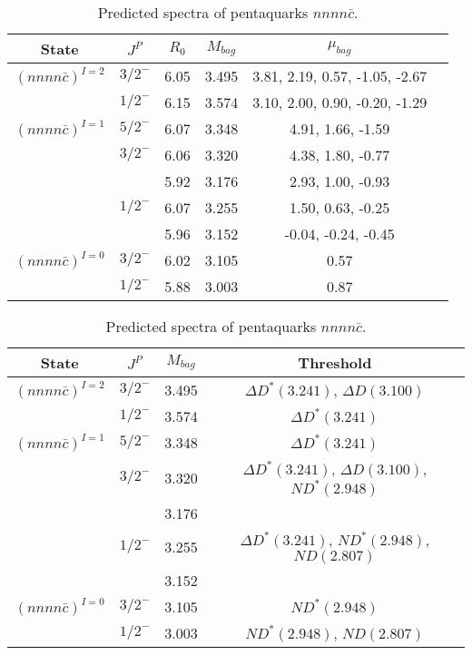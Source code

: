 \documentclass[prd,twocolumn,floatfix,nofootinbib]{revtex4}
\begin{document}
\renewcommand{\tabcolsep}{0.5cm}
\renewcommand{\arraystretch}{1.2}
\begin{table*}[!htbp]
    \caption{Predicted spectra of pentaquarks $nnnn\bar{c}$.}
    \begin{tabular}{cccccc}
        \hline\hline
        {\rm State} &$J^{P}$ &$R_{0}$ &$M_{bag}$ &$\mu_{bag}$  \\ \hline
        ${(nnnn\bar{c})}^{I=2}$
            &${3/2}^{-}$    &6.05   &3.495  &3.81, 2.19, 0.57, -1.05, -2.67 \\
            &${1/2}^{-}$    &6.15   &3.574  &3.10, 2.00, 0.90, -0.20, -1.29 \\
        ${(nnnn\bar{c})}^{I=1}$
            &${5/2}^{-}$    &6.07   &3.348  &4.91, 1.66, -1.59  \\
            &${3/2}^{-}$    &6.06   &3.320  &4.38, 1.80, -0.77  \\
            &               &5.92   &3.176  &2.93, 1.00, -0.93  \\
            &${1/2}^{-}$    &6.07   &3.255  &1.50, 0.63, -0.25  \\
            &               &5.96   &3.152  &-0.04, -0.24, -0.45  \\
        ${(nnnn\bar{c})}^{I=0}$
            &${3/2}^{-}$    &6.02   &3.105  &0.57  \\
            &${1/2}^{-}$    &5.88   &3.003  &0.87  \\
        \hline\hline
    \end{tabular}
\end{table*}

\renewcommand{\tabcolsep}{0.5cm}
\renewcommand{\arraystretch}{1.2}
\begin{table*}[!htbp]
    \caption{Predicted spectra of pentaquarks $nnnn\bar{c}$.}
    \begin{tabular}{cccc}
        \hline\hline
        {\rm State} &$J^{P}$ &$M_{bag}$ &{\rm Threshold} \\ \hline
        ${(nnnn\bar{c})}^{I=2}$
            &${3/2}^{-}$    &3.495 &$\Delta D^{\ast}(3.241)$, $\Delta D(3.100)$ \\
            &${1/2}^{-}$    &3.574 &$\Delta D^{\ast}(3.241)$ \\
        ${(nnnn\bar{c})}^{I=1}$
            &${5/2}^{-}$    &3.348 &$\Delta D^{\ast}(3.241)$ \\
            &${3/2}^{-}$    &3.320 &$\Delta D^{\ast}(3.241)$, $\Delta D(3.100)$, $N D^{\ast}(2.948)$ \\
            &               &3.176 & \\
            &${1/2}^{-}$    &3.255 &$\Delta D^{\ast}(3.241)$, $N D^{\ast}(2.948)$, $N D(2.807)$ \\
            &               &3.152 & \\
        ${(nnnn\bar{c})}^{I=0}$
            &${3/2}^{-}$    &3.105 &$N D^{\ast}(2.948)$ \\
            &${1/2}^{-}$    &3.003 &$N D^{\ast}(2.948)$, $N D(2.807)$ \\
        \hline\hline
    \end{tabular}
\end{table*}
\end{document}
